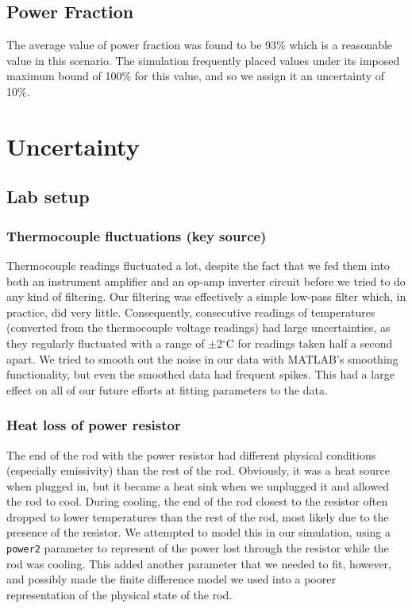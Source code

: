 \documentclass[letterpaper,titlepage,oneside]{report}
\begin{document}
\subsection* {Power Fraction}
The average value of power fraction was found to be 93\% which
is a reasonable value in this scenario. The simulation frequently
placed values under its imposed maximum bound of 100\% for this
value, and so we assign it an uncertainty of 10\%.

\section{Uncertainty}

\subsection*{Lab setup}

\subsubsection*{Thermocouple fluctuations (key source)}
Thermocouple readings fluctuated a lot, despite the fact that
we fed them into both an instrument amplifier and an op-amp
inverter circuit before we tried to do any kind of filtering.
Our filtering was effectively a simple low-pass filter which,
in practice, did very little. Consequently, consecutive
readings of temperatures (converted from the thermocouple
voltage readings) had large uncertainties, as they regularly
fluctuated with a range of $\pm$2$^{\circ}$C for readings taken
half a second apart. We tried to smooth out the noise in our data
with MATLAB's smoothing functionality, but even the smoothed
data had frequent spikes. This had a large effect on all of
our future efforts at fitting parameters to the data.

\subsubsection* {Heat loss of power resistor}
The end of the rod with the power resistor had different
physical conditions (especially emissivity) than the rest of
the rod. Obviously, it was a heat source when plugged in,
but it became a heat sink when we unplugged it and allowed the rod
to cool. During cooling, the end of the rod closest to the
resistor often dropped to lower temperatures than the rest of
the rod, most likely due to the presence of the resistor.
We attempted to model this in our simulation, using
a \texttt{power2} parameter to represent of the power lost through
the resistor while the rod was cooling. This added another
parameter that we needed to fit, however, and possibly made the
finite difference model we used into a poorer representation of
the physical state of the rod.
\end{document}
